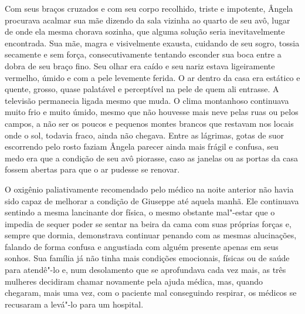 Com seus braços cruzados e com seu corpo recolhido, triste e impotente,
Ângela procurava acalmar sua mãe dizendo da sala vizinha ao quarto de
seu avô, lugar de onde ela mesma chorava sozinha, que alguma solução
seria inevitavelmente encontrada. Sua mãe, magra e visivelmente exausta,
cuidando de seu sogro, tossia secamente e sem força, consecutivamente
tentando esconder sua boca entre a dobra de seu braço fino. Seu olhar
era caído e seu nariz estava ligeiramente vermelho, úmido e com a pele
levemente ferida. O ar dentro da casa era estático e quente, grosso,
quase palatável e perceptível na pele de quem ali entrasse. A televisão
permanecia ligada mesmo que muda. O clima montanhoso continuava muito
frio e muito úmido, mesmo que não houvesse mais neve pelas ruas ou pelos
campos, a não ser os poucos e pequenos montes brancos que restavam nos
locais onde o sol, todavia fraco, ainda não chegava. Entre as lágrimas,
gotas de suor escorrendo pelo rosto faziam Ângela parecer ainda mais
frágil e confusa, seu medo era que a condição de seu avô piorasse, caso
as janelas ou as portas da casa fossem abertas para que o ar pudesse se
renovar.

O oxigênio paliativamente recomendado pelo médico na noite anterior não
havia sido capaz de melhorar a condição de Giuseppe até aquela manhã.
Ele continuava sentindo a mesma lancinante dor física, o mesmo obstante
mal"-estar que o impedia de sequer poder se sentar na beira da cama com
suas próprias forças e, sempre que dormia, demonstrava continuar penando
com as mesmas alucinações, falando de forma confusa e angustiada com
alguém presente apenas em seus sonhos. Sua família já não tinha mais
condições emocionais, físicas ou de saúde para atendê"-lo e, num
desolamento que se aprofundava cada vez mais, as três mulheres decidiram
chamar novamente pela ajuda médica, mas, quando chegaram, mais uma vez,
com o paciente mal conseguindo respirar, os médicos se recusaram a
levá"-lo para um hospital.

